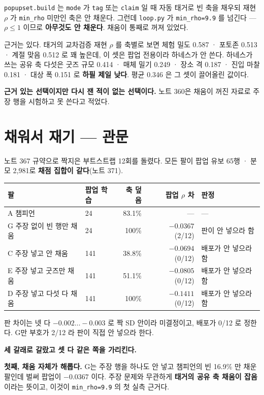 \documentclass[11pt]{article}
\begin{document}
\texttt{popupset.build} 는 \texttt{mode} 가 \texttt{tag} 또는
\texttt{claim} 일 때 자동 태거로 빈 축을 채우되 재현 $\rho$ 가
\texttt{min\_rho} 미만인 축은 안 채운다. 그런데 \texttt{loop.py} 가
\texttt{min\_rho=9.9} 를 넘긴다 --- $\rho\le1$ 이므로 \textbf{아무것도 안
채운다}. 채움이 통째로 꺼져 있었다.

근거는 있다. 태거의 교차검증 재현 $\rho$ 를 축별로 보면 체험 밀도 0.587 ·
포토존 0.513 · 계절 맞음 0.512 로 꽤 높은데, 이 셋은 팝업 전용이라
하네스가 안 쓴다. 하네스가 쓰는 공유 축 다섯은 굿즈 규모 0.414 · 매체 밀기
0.249 · 장소 격 0.187 · 진입 마찰 0.181 · 대상 폭 0.151 로 \textbf{하필
제일 낮다}. 평균 0.346 은 그 셋이 끌어올린 값이다.

\textbf{근거 있는 선택이지만 다시 잰 적이 없는 선택이다.} 노트 360은 채움이
꺼진 자료로 주장 행을 시험하고 못 쓴다고 적었다.

\section{채워서 재기 --- 관문}

노트 367 규약으로 짝지은 부트스트랩 12회를 돌렸다. 모든 팔이 팝업 유보
65행 · 분모 2,981로 \textbf{채점 집합이 같다}(노트 371).

\begin{center}
\begin{tabular}{llrrl}
\hline
팔 & 팝업 학습 & 축 덮음 & 팝업 $\rho$ 차 & 판정 \\
\hline
A 챔피언 & 24 & 83.1\% & --- & --- \\
G 주장 없이 빈 행만 채움 & 24 & 100\% & $-0.0367$ (2/12) & 판이 안 넣으라 함 \\
C 주장 넣고 안 채움 & 141 & 38.8\% & $-0.0694$ (0/12) & 배포가 안 넣으라 함 \\
E 주장 넣고 굿즈만 채움 & 141 & 51.1\% & $-0.0805$ (0/12) & 배포가 안 넣으라 함 \\
D 주장 넣고 다섯 다 채움 & 141 & 100\% & $\mathbf{-0.1411}$ (0/12) & 배포가 안 넣으라 함 \\
\hline
\end{tabular}
\end{center}

판 차이는 넷 다 $-0.002 \ldots -0.003$ 로 짝 SD 안이라 미결정이고, 배포가
0/12 로 정한다. G만 부호가 2/12 라 판이 직접 안 넣으라 한다.

\textbf{세 갈래로 갈랐고 셋 다 같은 쪽을 가리킨다.}

\textbf{첫째, 채움 자체가 해롭다.} G는 주장 행을 하나도 안 넣고
챔피언의 빈 16.9\% 만 채운 팔인데 벌써 팝업이 $-0.0367$ 이다. 주장
문제와 무관하게 \textbf{태거의 공유 축 채움이 잡음}이라는 뜻이고, 이것이
\texttt{min\_rho=9.9} 의 첫 실측 근거다.
\end{document}
